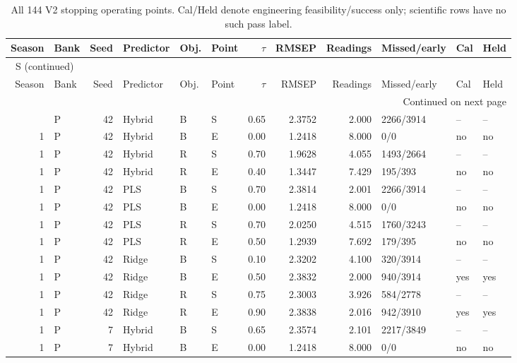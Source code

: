 \documentclass[10pt,a4paper]{article}
\renewcommand{\thetable}{S\arabic{table}}
\begin{document}
\clearpage
\begin{landscape}
\begingroup\footnotesize
\setlength{\tabcolsep}{3.5pt}
\renewcommand{\arraystretch}{1.10}
\begin{longtable}{rlrlllrrrlll}
\caption{All 144 V2 stopping operating points. Cal/Held denote engineering feasibility/success only; scientific rows have no such pass label.}\label{tab:v2adaptive}\\
\toprule
Season & Bank & Seed & Predictor & Obj. & Point & $\tau$ & RMSEP & Readings & Missed/early & Cal & Held \\
\midrule
\endfirsthead
\multicolumn{12}{l}{\tablename~\thetable{} (continued)}\\
\toprule
Season & Bank & Seed & Predictor & Obj. & Point & $\tau$ & RMSEP & Readings & Missed/early & Cal & Held \\
\midrule
\endhead
\midrule
\multicolumn{12}{r}{Continued on next page}\\
\endfoot
\bottomrule
\endlastfoot
1 & P & 42 & Hybrid & B & S & 0.65 & 2.3752 & 2.000 & 2266/3914 & -- & -- \\
1 & P & 42 & Hybrid & B & E & 0.00 & 1.2418 & 8.000 & 0/0 & no & no \\
1 & P & 42 & Hybrid & R & S & 0.70 & 1.9628 & 4.055 & 1493/2664 & -- & -- \\
1 & P & 42 & Hybrid & R & E & 0.40 & 1.3447 & 7.429 & 195/393 & no & no \\
1 & P & 42 & PLS & B & S & 0.70 & 2.3814 & 2.001 & 2266/3914 & -- & -- \\
1 & P & 42 & PLS & B & E & 0.00 & 1.2418 & 8.000 & 0/0 & no & no \\
1 & P & 42 & PLS & R & S & 0.70 & 2.0250 & 4.515 & 1760/3243 & -- & -- \\
1 & P & 42 & PLS & R & E & 0.50 & 1.2939 & 7.692 & 179/395 & no & no \\
1 & P & 42 & Ridge & B & S & 0.10 & 2.3202 & 4.100 & 320/3914 & -- & -- \\
1 & P & 42 & Ridge & B & E & 0.50 & 2.3832 & 2.000 & 940/3914 & yes & yes \\
1 & P & 42 & Ridge & R & S & 0.75 & 2.3003 & 3.926 & 584/2778 & -- & -- \\
1 & P & 42 & Ridge & R & E & 0.90 & 2.3838 & 2.016 & 942/3910 & yes & yes \\
1 & P & 7 & Hybrid & B & S & 0.65 & 2.3574 & 2.101 & 2217/3849 & -- & -- \\
1 & P & 7 & Hybrid & B & E & 0.00 & 1.2418 & 8.000 & 0/0 & no & no \\

\end{longtable}
\end{landscape}
\end{document}

